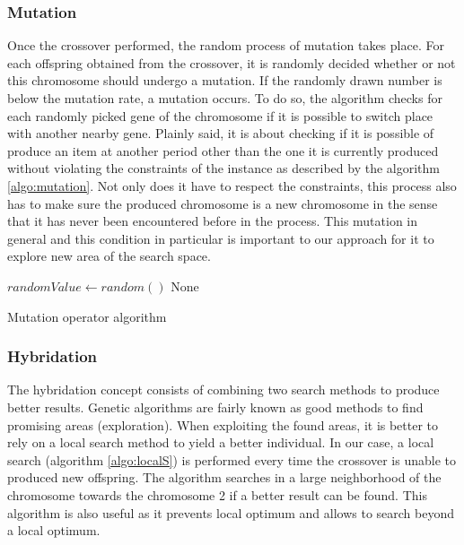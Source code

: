 \documentclass[twocolumn,10pt]{asme2ej}
\begin{document}
\subsubsection{Mutation}

Once the crossover performed, the random process of mutation takes place. For each offspring obtained from the crossover, it is randomly decided whether or not this chromosome should undergo a mutation. If the randomly drawn number is below the mutation rate, a mutation occurs. To do so, the algorithm checks for each randomly picked gene of the chromosome if it is possible to switch place with another nearby gene. Plainly said, it is about checking if it is possible of produce an item at another period other than the one it is currently produced without violating the constraints of the instance as described by the algorithm \ref{algo:mutation}. Not only does it have to respect the constraints, this process also has to make sure the produced chromosome is a new chromosome in the sense that it has never been encountered before in the process. This mutation in general and this condition in particular is important to our approach for it to explore new area of the search space.

\begin{algorithm}[!ht]
\DontPrintSemicolon
    $randomValue \gets random() $\;
    \Return None
    
\caption{Mutation operator algorithm}
\label{algo:mutation}
\end{algorithm}

\subsubsection{Hybridation}

The hybridation concept consists of combining two search methods to produce better results. Genetic algorithms are fairly known as good methods to find promising areas (exploration). When exploiting the found areas, it is better to rely on a local search method to yield a better individual. In our case, a local search (algorithm \ref{algo:localS}) is performed every time the crossover is unable to produced new offspring. The algorithm searches in a large neighborhood of the chromosome towards the chromosome 2 if a better result can be found. This algorithm is also useful as it prevents local optimum and allows to search beyond a local optimum.
\end{document}
